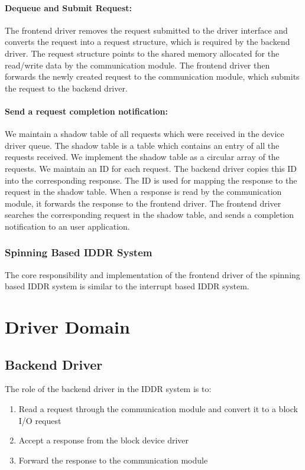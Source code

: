 \paragraph{Dequeue and Submit Request:}
The frontend driver removes the request submitted to the driver
interface and converts the request into a request structure, which is
required by the backend driver. The request structure points to
the shared memory allocated for the read/write data by the communication
module. The frontend driver then forwards the newly created request
to the communication module, which submits the request to the
backend driver.

\paragraph{Send a request completion notification:}
We maintain a shadow table of all requests which were received in the
device driver queue. The shadow table is a table which contains an entry
of all the requests received. We implement the shadow table as a circular
array of the requests. We maintain an ID for each request. The backend
driver copies this ID into the corresponding response. The ID is used
for mapping the response to the request in the shadow table. When a
response is read by the communication module, it forwards the response
to the frontend driver. The frontend driver searches the corresponding
request in the shadow table, and sends a completion notification to 
an user application.

\subsubsection*{Spinning Based IDDR System}
The core responsibility and implementation of the frontend driver of 
the spinning based IDDR system is similar to the interrupt based IDDR system.

\section{Driver Domain}

\subsection{Backend Driver}

The role of the backend driver in the IDDR system is to:
\begin{enumerate}
\item Read a request through the communication module and convert it to a block I/O request
\item Accept a response from the block device driver
\item Forward the response to the communication module
\end{enumerate}

